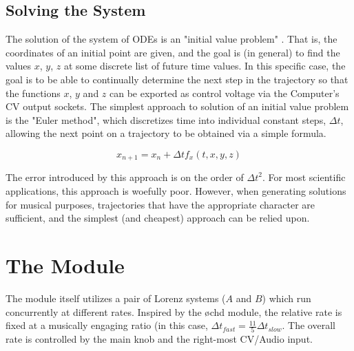 \documentclass{tufte-handout}
\begin{document}
\subsection{Solving the System}\label{sec:solving_the_system}

The solution of the system of ODEs is an "initial value problem" . That is, the coordinates of an initial point are given, and the goal is (in general) to find the values $x$, $y$, $z$ at some discrete list of future time values. In this specific case, the goal is to be able to continually determine the next step in the trajectory so that the functions $x$, $y$ and $z$ can be exported as control voltage via the Computer's CV output sockets.
The simplest approach to solution of an initial value problem is the "Euler method", which discretizes time into individual constant steps, $\Delta t$, allowing the next point on a trajectory to be obtained via a simple formula.

$$x_{n+1} = x_n + \Delta t f_{x}(t, x, y, z)$$

The error introduced by this approach is on the order of ${\Delta t}^2$. For most scientific applications, this approach is woefully poor. However, when generating solutions for musical purposes, trajectories that have the appropriate character are sufficient, and the simplest (and cheapest) approach can be relied upon.

\section{The Module}\label{sec:the_module}

The module itself utilizes a pair of Lorenz systems ($A$ and $B$) which run concurrently at different rates. Inspired by the \o chd module, the relative rate is fixed at a musically engaging ratio (in this case, $\Delta t_{fast} = \frac{11}{5} \Delta t_{slow}$. The overall rate is controlled by the main knob and the right-most CV/Audio input. 
\end{document}
